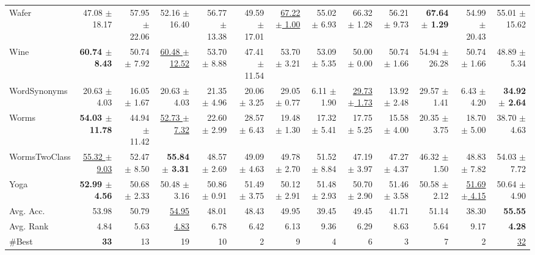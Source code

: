 \begin{landscape}
\begin{longtable}{lrrrrrrrrrrrr}
Wafer & 47.08 $\pm$ 18.17 & 57.95 $\pm$ 22.06 & 52.16 $\pm$ 16.40 & 56.77 $\pm$ 13.38 & 49.59 $\pm$ 17.01 & \underline{67.22 $\pm$ 1.00} & 55.02 $\pm$ 6.93 & 66.32 $\pm$ 1.28 & 56.21 $\pm$ 9.73 & \textbf{67.64 $\pm$ 1.29} & 54.99 $\pm$ 20.43 & 55.01 $\pm$ 15.62 \\
Wine & \textbf{60.74 $\pm$ 8.43} & 50.74 $\pm$ 7.92 & \underline{60.48 $\pm$ 12.52} & 53.70 $\pm$ 8.88 & 47.41 $\pm$ 11.54 & 53.70 $\pm$ 3.21 & 53.09 $\pm$ 5.35 & 50.00 $\pm$ 0.00 & 50.74 $\pm$ 1.66 & 54.94 $\pm$ 26.28 & 50.74 $\pm$ 1.66 & 48.89 $\pm$ 5.34 \\
WordSynonyms & 20.63 $\pm$ 4.03 & 16.05 $\pm$ 1.67 & 20.63 $\pm$ 4.03 & 21.35 $\pm$ 4.96 & 20.06 $\pm$ 3.25 & 29.05 $\pm$ 0.77 & 6.11 $\pm$ 1.90 & \underline{29.73 $\pm$ 1.73} & 13.92 $\pm$ 2.48 & 29.57 $\pm$ 1.41 & 6.43 $\pm$ 4.20 & \textbf{34.92 $\pm$ 2.64} \\
Worms & \textbf{54.03 $\pm$ 11.78} & 44.94 $\pm$ 11.42 & \underline{52.73 $\pm$ 7.32} & 22.60 $\pm$ 2.99 & 28.57 $\pm$ 6.43 & 19.48 $\pm$ 1.30 & 17.32 $\pm$ 5.41 & 17.75 $\pm$ 5.25 & 15.58 $\pm$ 4.00 & 20.35 $\pm$ 3.75 & 18.70 $\pm$ 5.00 & 38.70 $\pm$ 4.63 \\
WormsTwoClass & \underline{55.32 $\pm$ 9.03} & 52.47 $\pm$ 8.50 & \textbf{55.84 $\pm$ 3.31} & 48.57 $\pm$ 2.69 & 49.09 $\pm$ 4.63 & 49.78 $\pm$ 2.70 & 51.52 $\pm$ 8.84 & 47.19 $\pm$ 3.97 & 47.27 $\pm$ 4.37 & 46.32 $\pm$ 1.50 & 48.83 $\pm$ 7.82 & 54.03 $\pm$ 7.72 \\
Yoga & \textbf{52.99 $\pm$ 4.56} & 50.68 $\pm$ 2.33 & 50.48 $\pm$ 3.16 & 50.86 $\pm$ 0.91 & 51.49 $\pm$ 3.75 & 50.12 $\pm$ 2.91 & 51.48 $\pm$ 2.93 & 50.70 $\pm$ 2.90 & 51.46 $\pm$ 3.58 & 50.58 $\pm$ 2.12 & \underline{51.69 $\pm$ 4.15} & 50.64 $\pm$ 4.90 \\
\midrule
Avg. Acc. & 53.98 & 50.79 & \underline{54.95} & 48.01 & 48.43 & 49.95 & 39.45 & 49.45 & 41.71 & 51.14 & 38.30 & \textbf{55.55} \\
Avg. Rank & 4.84 & 5.63 & \underline{4.83} & 6.78 & 6.42 & 6.13 & 9.36 & 6.29 & 8.63 & 5.64 & 9.17 & \textbf{4.28} \\
\#Best & \textbf{33} & 13 & 19 & 10 & 2 & 9 & 4 & 6 & 3 & 7 & 2 & \underline{32} \\
\end{longtable}
\endgroup
\end{landscape}

